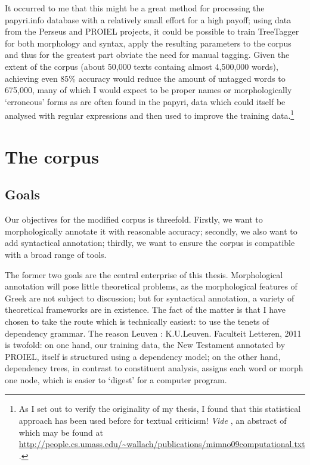 \documentclass[10pt,a4paper,twoside,openright,titlepage,fleqn,%
               headinclude,,footinclude,BCOR5mm,%
               numbers=noenddot,cleardoublepage=empty,%
               tablecaptionabove]{scrbook}
\begin{document}
It occurred to me that this might be a great method for processing the
papyri.info database with a relatively small effort for a high payoff; using
data from the Perseus and PROIEL projects, it could be possible to train
TreeTagger for both morphology and syntax, apply the resulting parameters to
the corpus and thus for the greatest part obviate the need for manual tagging.
Given the extent of the corpus (about 50,000 texts containg almost 4,500,000
words), achieving even 85\% accuracy would reduce the amount of untagged words
to 675,000, many of which I would expect to be proper names or morphologically
`erroneous' forms as are often found in the papyri, data which could itself be
analysed with regular expressions and then used to improve the training
data.\footnote{As I set out to verify the originality of my thesis, I found
  that this statistical approach has been used before for textual criticism!
  \textit{Vide} \citet{mimno2009}, an abstract of which may be found at
  \url{http://people.cs.umass.edu/~wallach/publications/mimno09computational.txt}.}

\chapter{The corpus}
\label{chp:design}
\minitoc\mtcskip
\section{Goals}

Our objectives for the modified corpus is threefold. Firstly, we want to
morphologically annotate it with reasonable accuracy; secondly, we also want to
add syntactical annotation; thirdly, we want to ensure the corpus is compatible
with a broad range of tools.

The former two goals are the central enterprise of this thesis. Morphological
annotation will pose little theoretical problems, as the morphological features
of Greek are not subject to discussion; but for syntactical annotation, a
variety of theoretical frameworks are in existence. The fact of the matter is
that I have chosen to take the route which is technically easiest: to use the
tenets of dependency grammar. The reason Leuven : K.U.Leuven. Faculteit Letteren, 2011 is twofold: on one hand, our training
data, the New Testament annotated by PROIEL, itself is structured using a
dependency model; on the other hand, dependency trees, in contrast to
constituent analysis, assigns each word or morph one node, which is easier to
`digest' for a computer program.
\end{document}
